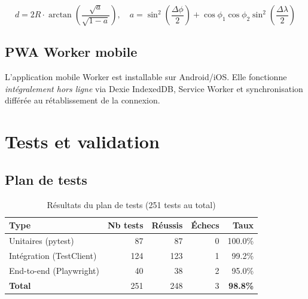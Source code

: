 \documentclass[12pt,a4paper,twoside]{report}
\newcounter{hi}
\begin{document}
\begin{equation}
d = 2R \cdot \arctan\!\left(\frac{\sqrt{a}}{\sqrt{1-a}}\right), \quad
a = \sin^2\!\!\left(\frac{\Delta\phi}{2}\right) + \cos\phi_1 \cos\phi_2 \sin^2\!\!\left(\frac{\Delta\lambda}{2}\right)
\label{eq:haversine}
\end{equation}

\subsection{PWA Worker mobile}

L'application mobile Worker est installable sur Android/iOS.
Elle fonctionne \textit{intégralement hors ligne} via Dexie IndexedDB,
Service Worker et synchronisation différée au rétablissement de la connexion.

\section{Tests et validation}

\subsection{Plan de tests}

\begin{table}[H]
\centering
\caption{Résultats du plan de tests (251 tests au total)}
\label{tab:tests}
\begin{tabular}{lrrrr}
\toprule
\textbf{Type} & \textbf{Nb tests} & \textbf{Réussis} & \textbf{Échecs} & \textbf{Taux} \\
\midrule
Unitaires (pytest)     & 87  & 87  & 0 & 100.0\% \\
Intégration (TestClient) & 124 & 123 & 1 & 99.2\% \\
End-to-end (Playwright) & 40  & 38  & 2 & 95.0\% \\
\midrule
\textbf{Total}          & 251 & 248 & 3 & \textbf{98.8\%} \\
\bottomrule
\end{tabular}
\end{table}
\end{document}
